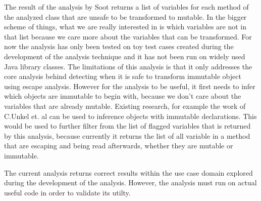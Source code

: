 The result of the analysis by Soot returns a list of variables for each method of the analyzed class that are unsafe to be transformed to mutable. In the bigger scheme of things, what we are really interested in is which variables are not in that list because we care more about the variables that can be transformed. For now the analysis has only been tested on toy test cases created during the development of the analysis technique and it has not been run on widely used Java library classes. The limitations of this analysis is that it only addresses the core analysis behind detecting when it is safe to transform immutable object using escape analysis. However for the analysis to be useful, it first needs to infer which objects are immutable to begin with, because we don't care about the variables that are already mutable. Existing research, for example the work of C.Unkel et. al \cite{ref:finalinference} can be used to inference objects with immutable declarations. This would be used to further filter from the list of flagged variables that is returned by this analysis, because currently it returns the list of all variable in a method that are escaping and being read afterwards, whether they are mutable or immutable.

The current analysis returns correct results within the use case domain explored during the development of the analysis. However, the analysis must run on actual useful code in order to validate its utilty.